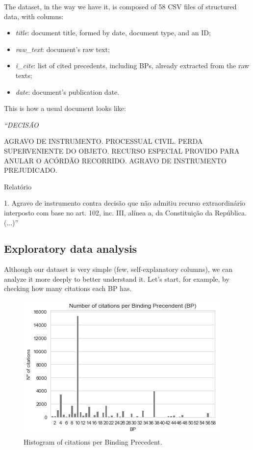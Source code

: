 \documentclass[twocolumn]{article}
\begin{document}
                  The dataset, in the way we have it, is composed of 58 CSV files of structured data, with columns:
                  \begin{itemize}
                        \item \textit{title}: document title, formed by date, document type, and an ID;
                        \item \textit{raw\_text}: document's raw text;
                        \item \textit{i\_cite}: list of cited precedents, including BPs, already extracted from the raw texts;
                        \item \textit{date}: document's publication date.
                  \end{itemize}

                  This is how a usual document looks like:

                  \bigskip

                  {\itshape``DECISÃO

                  AGRAVO DE INSTRUMENTO. PROCESSUAL CIVIL. PERDA SUPERVENIENTE DO OBJETO. RECURSO ESPECIAL PROVIDO PARA ANULAR O ACÓRDÃO RECORRIDO. AGRAVO DE INSTRUMENTO PREJUDICADO.

                  Relatório

                  1. Agravo de instrumento contra decisão que não admitiu recurso extraordinário interposto com base no art. 102, inc. III, alínea a, da Constituição da República. (...)''}

            \subsection{Exploratory data analysis}

                  Although our dataset is very simple (few, self-explanatory columns), we can analyze it more deeply to better understand it. Let's start, for example, by checking how many citations each BP has.

                  \begin{figure}[H]
                        \includegraphics[width=\linewidth]{bp_citations.png}
                        \caption{Histogram of citations per Binding Precedent.}
                        \label{fig:bp_citations}
                  \end{figure}
\end{document}
